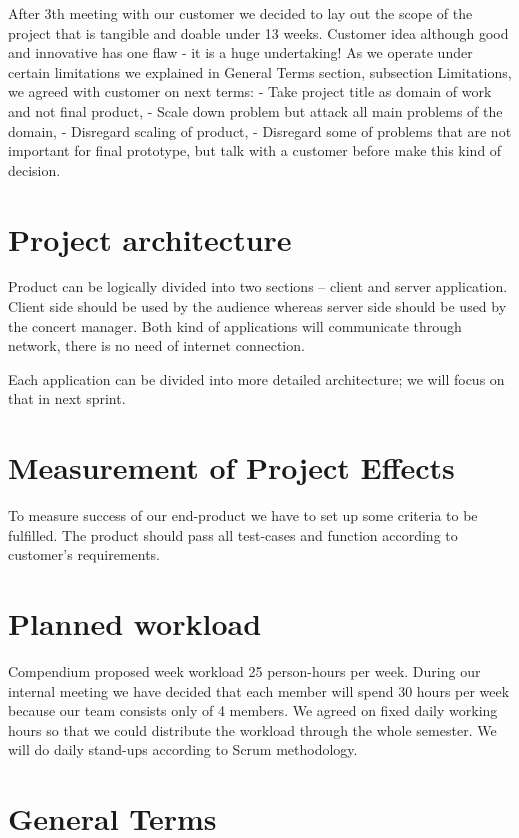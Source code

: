 \documentclass{article}
\begin{document}
After 3th meeting with our customer we decided to lay out the scope of the project that is tangible and doable under 13 weeks. Customer idea although good and innovative has one flaw - it is a huge undertaking!
As we operate under certain limitations we explained in General Terms section, subsection Limitations, we agreed with customer on next terms:
 - Take project title as domain of work and not final product,
 - Scale down problem but attack all main problems of the domain,
 - Disregard scaling of product,
 - Disregard some of problems that are not important for final prototype, but talk with a customer before make this kind of decision.

\section{Project architecture}
Product can be logically divided into two sections -- client and server application.
Client side should be used by the audience whereas server side should be used by the concert manager.
Both kind of applications will communicate through network, there is no need of internet connection.

Each application can be divided into more detailed architecture; we will focus on that in next sprint.


\section{Measurement of Project Effects}
To measure success of our end-product we have to set up some criteria to be fulfilled. The product should pass all test-cases and function according to customer's requirements.

\section{Planned workload}
Compendium proposed week workload 25 person-hours per week. During our internal meeting we have decided that each member will spend 30 hours per week because our team consists only of 4 members. We agreed on fixed daily working hours so that we could distribute the workload through the whole semester. We will do daily stand-ups according to Scrum methodology.

\section{General Terms}
\end{document}

